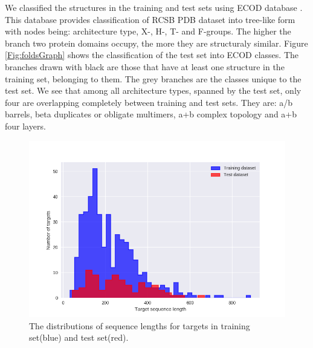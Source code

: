 \documentclass[a4paper,10pt]{article}
\begin{document}
We classified the structures in the training and test sets using ECOD database \cite{}. This database provides classification of 
RCSB PDB dataset into tree-like form with nodes being: architecture type, X-, H-, T- and F-groups. The higher the branch two protein 
domains occupy, the more they are structuraly similar. Figure \ref{Fig:foldsGraph} shows the classification of the test set into ECOD classes. The 
branches drawn with black are those that have at least one structure in the training set, belonging to them. The grey branches are the 
classes unique to the test set. We see that among all architecture types, spanned by the test set, only four are overlapping completely
between training and test sets. They are: a/b barrels, beta duplicates or obligate multimers, a+b complex topology and a+b four layers.


\begin{figure}[H]
    \centering
    \includegraphics[width=\linewidth]{Fig/datasetLengthDistributions.png}
    \caption{The distributions of sequence lengths for targets in training set(blue) and test set(red).}
    \label{Fig:dataLengthDist}
\end{figure}
\end{document}

